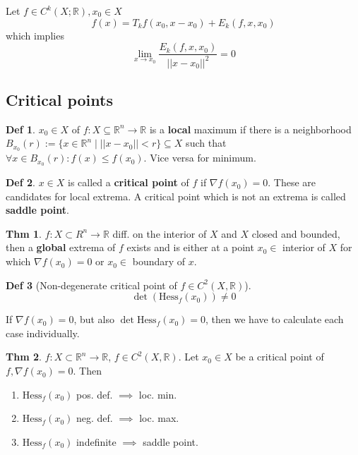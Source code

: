 \documentclass[a4paper, 10pt]{article}
\theoremstyle{definition}
\newtheorem*{theorem}{Thm}
\newtheorem*{definition}{Def}
\newcommand{\R}{\mathbb{R}}
\newcommand{\Hess}{\text{Hess}}
\begin{document}
\begin{ntheorem*}
    Let \(f \in C^k(X; \R), x_0 \in X\)
    \[f(x) = T_k f(x_0, x - x_0) + E_k(f, x, x_0)\]
    which implies
    \[\lim_{x \to x_0} \frac{E_k(f, x, x_0)}{||x - x_0||^2} = 0\]
\end{ntheorem*}

\pagebreak
\subsection{Critical points}
\begin{definition}
    \(x_0 \in X\) of \(f: X \subseteq \R^n \to \R\) is a \textbf{local} maximum if there is a neighborhood \(B_{x_0}(r) := \{x \in \R^n \mid ||x - x_0|| < r\} \subseteq X \) such that \(\forall x \in B_{x_0}(r): f(x) \leq f(x_0)\). Vice versa for minimum.
\end{definition}

\begin{definition}
    \(x \in X\) is called a \textbf{critical point} of \(f\) if \(\nabla f(x_0) = 0\). These are candidates for local extrema. A critical point which is not an extrema is called  \textbf{saddle point}.
\end{definition}

\begin{theorem}
    \(f: X \subset R^n \to \R\) diff. on the interior of \(X\) and \(X\) closed and bounded, then a \textbf{global} extrema of \(f\) exists and is either at a point \(x_0 \in\) interior of \(X\) for which \(\nabla f(x_0) = 0\) or \(x_0 \in\) boundary of \(x\).
\end{theorem}

\begin{definition}[Non-degenerate critical point of \(f \in C^2(X, \R)\)]
    \[\det(\Hess_f(x_0)) \neq 0\]
\end{definition}

\begin{note*}
    If \(\nabla f(x_0) = 0\), but also \(\det \Hess_f(x_0) = 0\), then we have to calculate each case individually.
\end{note*}

\begin{theorem}
    \(f: X \subset \R^n \to \R\), \(f \in C^2(X, \R)\). Let \(x_0 \in X\) be a critical point of \(f, \nabla f(x_0) = 0\). Then
    \begin{enumerate}
        \item \(\Hess_f(x_0)\) pos. def. \(\implies\) loc. min.
        \item \(\Hess_f(x_0)\) neg. def. \(\implies\) loc. max.
        \item \(\Hess_f(x_0)\) indefinite \(\implies\) saddle point.
    \end{enumerate}
\end{theorem}
\end{document}
